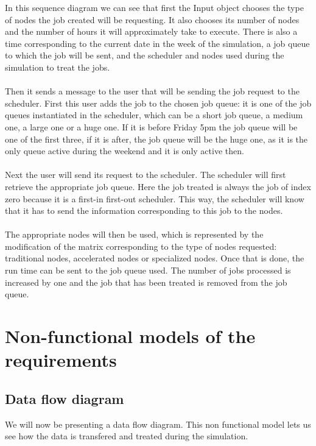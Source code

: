\documentclass [10 pt, a4 paper]{report}
\begin{document}
\noindent
In this sequence diagram we can see that first the Input object chooses the type of nodes the job created will be requesting. It also chooses its number of nodes and the number of hours it will approximately take to execute. There is also a time corresponding to the current date in the week of the simulation, a job queue to which the job will be sent, and the scheduler and nodes used during the simulation to treat the jobs.
\\ \\
Then it sends a message to the user that will be sending the job request to the scheduler. First this user adds the job to the chosen job queue: it is one of the job queues instantiated in the scheduler, which can be a short job queue, a medium one, a large one or a huge one. If it is before Friday 5pm the job queue will be one of the first three, if it is after, the job queue will be the huge one, as it is the only queue active during the weekend and it is only active then.
\\ \\
Next the user will send its request to the scheduler. The scheduler will first retrieve the appropriate job queue. Here the job treated is always the job of index zero because it is a first-in first-out scheduler. This way, the scheduler will know that it has to send the information corresponding to this job to the nodes.
\\ \\
The appropriate nodes will then be used, which is represented by the modification of the matrix corresponding to the type of nodes requested: traditional nodes, accelerated nodes or specialized nodes. Once that is done, the run time can be sent to the job queue used. The number of jobs processed is increased by one and the job that has been treated is removed from the job queue.








\clearpage
\noindent

\section{Non-functional models of the requirements}
\subsection{Data flow diagram}
We will now be presenting a data flow diagram. This non functional model lets us see how the data is transfered and treated during the simulation.
\end{document}
